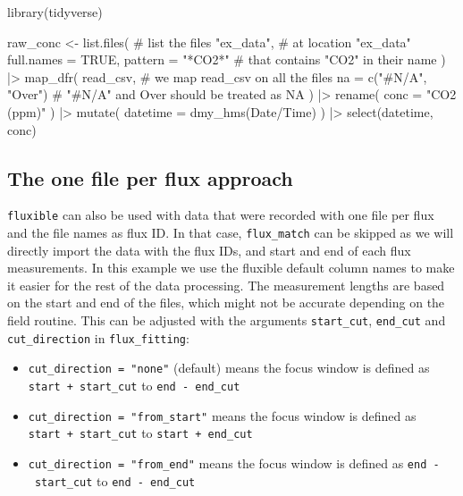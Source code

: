 \documentclass[
  letterpaper,
  DIV=11,
  numbers=noendperiod]{scrartcl}
\newenvironment{Shaded}{\begin{snugshade}}{\end{snugshade}}
\newcommand{\AttributeTok}[1]{\textcolor[rgb]{0.40,0.45,0.13}{#1}}
\newcommand{\CommentTok}[1]{\textcolor[rgb]{0.37,0.37,0.37}{#1}}
\newcommand{\ConstantTok}[1]{\textcolor[rgb]{0.56,0.35,0.01}{#1}}
\newcommand{\FunctionTok}[1]{\textcolor[rgb]{0.28,0.35,0.67}{#1}}
\newcommand{\NormalTok}[1]{\textcolor[rgb]{0.00,0.23,0.31}{#1}}
\newcommand{\OtherTok}[1]{\textcolor[rgb]{0.00,0.23,0.31}{#1}}
\newcommand{\SpecialCharTok}[1]{\textcolor[rgb]{0.37,0.37,0.37}{#1}}
\newcommand{\StringTok}[1]{\textcolor[rgb]{0.13,0.47,0.30}{#1}}
\providecommand{\tightlist}{%
  \setlength{\itemsep}{0pt}\setlength{\parskip}{0pt}}\usepackage{longtable,booktabs,array}
\begin{document}
\begin{Shaded}
\begin{Highlighting}[]
\FunctionTok{library}\NormalTok{(tidyverse)}

\NormalTok{raw\_conc }\OtherTok{\textless{}{-}} \FunctionTok{list.files}\NormalTok{( }\CommentTok{\# list the files}
  \StringTok{"ex\_data"}\NormalTok{, }\CommentTok{\# at location "ex\_data"}
  \AttributeTok{full.names =} \ConstantTok{TRUE}\NormalTok{,}
  \AttributeTok{pattern =} \StringTok{"*CO2*"} \CommentTok{\# that contains "CO2" in their name}
\NormalTok{) }\SpecialCharTok{|\textgreater{}}
  \FunctionTok{map\_dfr}\NormalTok{(}
\NormalTok{    read\_csv, }\CommentTok{\# we map read\_csv on all the files}
    \AttributeTok{na =} \FunctionTok{c}\NormalTok{(}\StringTok{"\#N/A"}\NormalTok{, }\StringTok{"Over"}\NormalTok{) }\CommentTok{\# "\#N/A" and Over should be treated as NA}
\NormalTok{  ) }\SpecialCharTok{|\textgreater{}}
  \FunctionTok{rename}\NormalTok{(}
    \AttributeTok{conc =} \StringTok{"CO2 (ppm)"}
\NormalTok{  ) }\SpecialCharTok{|\textgreater{}}
  \FunctionTok{mutate}\NormalTok{(}
    \AttributeTok{datetime =} \FunctionTok{dmy\_hms}\NormalTok{(}\StringTok{\textasciigrave{}}\AttributeTok{Date/Time}\StringTok{\textasciigrave{}}\NormalTok{)}
\NormalTok{  ) }\SpecialCharTok{|\textgreater{}}
  \FunctionTok{select}\NormalTok{(datetime, conc)}
\end{Highlighting}
\end{Shaded}

\subsection{The one file per flux approach}\label{sec-onefileflux}

\texttt{fluxible} can also be used with data that were recorded with one
file per flux and the file names as flux ID. In that case,
\texttt{flux\_match} can be skipped as we will directly import the data
with the flux IDs, and start and end of each flux measurements. In this
example we use the fluxible default column names to make it easier for
the rest of the data processing. The measurement lengths are based on
the start and end of the files, which might not be accurate depending on
the field routine. This can be adjusted with the arguments
\texttt{start\_cut}, \texttt{end\_cut} and \texttt{cut\_direction} in
\texttt{flux\_fitting}:

\begin{itemize}
\tightlist
\item
  \texttt{cut\_direction\ =\ "none"} (default) means the focus window is
  defined as \texttt{start\ +\ start\_cut} to \texttt{end\ -\ end\_cut}
\item
  \texttt{cut\_direction\ =\ "from\_start"} means the focus window is
  defined as \texttt{start\ +\ start\_cut} to
  \texttt{start\ +\ end\_cut}
\item
  \texttt{cut\_direction\ =\ "from\_end"} means the focus window is
  defined as \texttt{end\ -\ start\_cut} to \texttt{end\ -\ end\_cut}
\end{itemize}
\end{document}
